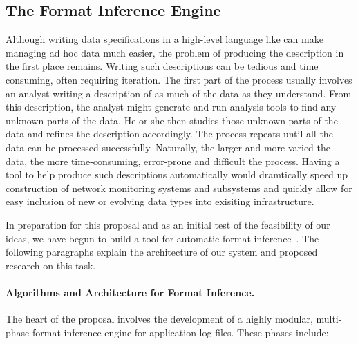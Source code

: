 \subsection{The Format Inference Engine}

Although writing data specifications in a high-level language like
\pads{} can make managing ad hoc data much easier,
the problem of producing the description in the first place
remains. Writing such descriptions can be tedious and time consuming,
often requiring iteration. The first part of the process usually
involves an analyst writing a description of as
much of the data as they understand. From this description, the analyst
might generate and run analysis tools to find any unknown parts of the
data. He or she then studies those unknown parts of the data and refines the description
accordingly.   The process repeats until all the data can be processed successfully.
Naturally, the larger and more varied the data, the more time-consuming,
error-prone and difficult the process.  Having a tool to help produce such 
descriptions automatically would dramtically speed up construction of
network monitoring systems and subsystems and quickly allow for easy inclusion of
new or evolving data types into exisiting infrastructure.






In preparation for this proposal and as an initial test of the
feasibility of our ideas, we have begun to build a tool for automatic
format inference~\cite{Fisher+:dirttoshovels}.  The following paragraphs explain the architecture
of our system and proposed research on this task.

\paragraph*{Algorithms and Architecture for Format Inference.}
The heart of the proposal involves the development of a highly modular, multi-phase
format inference engine for application log files.  These phases include:

